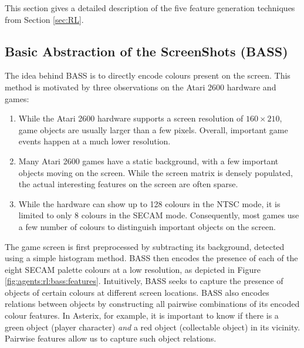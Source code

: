 \documentclass[twoside,11pt]{article}
\newcommand{\gamename}[1]{{\sc #1}}
\begin{document}
This section gives a detailed description of the five feature generation techniques from Section \ref{sec:RL}. 

\subsection{Basic Abstraction of the ScreenShots (BASS)}
\label{sec:agents:rl:bass}
The idea behind BASS is to directly encode colours present on the screen. This method is motivated by three observations on the Atari 2600 hardware and games:
\begin{enumerate}
	\item While the Atari 2600 hardware supports a screen resolution of $160 \times 210$, game objects are usually larger than a few pixels. Overall, important game events happen at a much lower resolution.
	\item Many Atari 2600 games have a static background, with a few important objects moving on the screen. While the screen matrix is densely populated, the actual interesting features on the screen are often sparse.  
	\item While the hardware can show up to 128 colours in the NTSC mode, it is limited to only 8 colours in the SECAM mode. Consequently, most games use a few number of colours to distinguish important objects on the screen. 
\end{enumerate}
The game screen is first preprocessed by subtracting its background, detected using a simple histogram method. BASS then encodes the presence of each of the eight SECAM palette colours at a low resolution, as depicted in Figure \ref{fig:agents:rl:bass:features}. Intuitively, BASS seeks to capture the presence of objects of certain colours at different screen locations. BASS also encodes relations between objects by constructing all pairwise combinations of its encoded colour features. In \gamename{Asterix}, for example, it is important to know if there is a green object (player character) \emph{and} a red object (collectable object) in its vicinity. Pairwise features allow us to capture such object relations.
\end{document}
